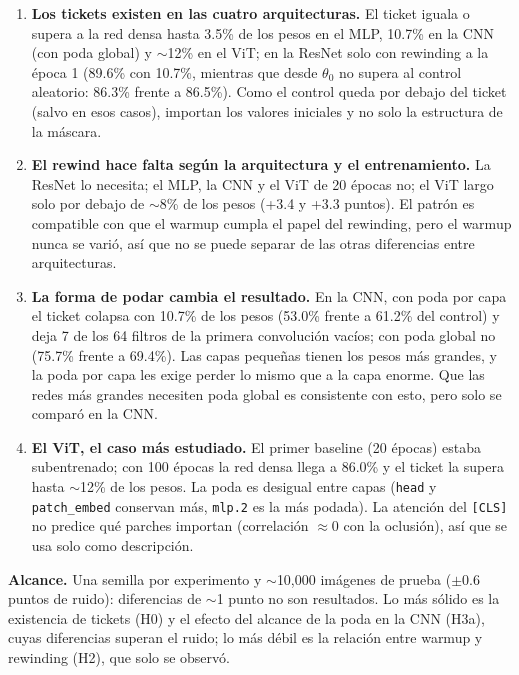 \documentclass[11pt]{article}
\begin{document}
\begin{enumerate}[nosep]
    \item \textbf{Los tickets existen en las cuatro arquitecturas.} El ticket iguala o supera a la red densa hasta 3.5\% de los pesos en el MLP, 10.7\% en la CNN (con poda global) y $\sim$12\% en el ViT; en la ResNet solo con rewinding a la época 1 (89.6\% con 10.7\%, mientras que desde $\theta_0$ no supera al control aleatorio: 86.3\% frente a 86.5\%). Como el control queda por debajo del ticket (salvo en esos casos), importan los valores iniciales y no solo la estructura de la máscara.
    \item \textbf{El rewind hace falta según la arquitectura y el entrenamiento.} La ResNet lo necesita; el MLP, la CNN y el ViT de 20 épocas no; el ViT largo solo por debajo de $\sim$8\% de los pesos (+3.4 y +3.3 puntos). El patrón es compatible con que el warmup cumpla el papel del rewinding, pero el warmup nunca se varió, así que no se puede separar de las otras diferencias entre arquitecturas.
    \item \textbf{La forma de podar cambia el resultado.} En la CNN, con poda por capa el ticket colapsa con 10.7\% de los pesos (53.0\% frente a 61.2\% del control) y deja 7 de los 64 filtros de la primera convolución vacíos; con poda global no (75.7\% frente a 69.4\%). Las capas pequeñas tienen los pesos más grandes, y la poda por capa les exige perder lo mismo que a la capa enorme. Que las redes más grandes necesiten poda global es consistente con esto, pero solo se comparó en la CNN.
    \item \textbf{El ViT, el caso más estudiado.} El primer baseline (20 épocas) estaba subentrenado; con 100 épocas la red densa llega a 86.0\% y el ticket la supera hasta $\sim$12\% de los pesos. La poda es desigual entre capas (\texttt{head} y \texttt{patch\_embed} conservan más, \texttt{mlp.2} es la más podada). La atención del \texttt{[CLS]} no predice qué parches importan (correlación $\approx0$ con la oclusión), así que se usa solo como descripción.
\end{enumerate}

\textbf{Alcance.} Una semilla por experimento y $\sim$10,000 imágenes de prueba ($\pm0.6$ puntos de ruido): diferencias de $\sim$1 punto no son resultados. Lo más sólido es la existencia de tickets (H0) y el efecto del alcance de la poda en la CNN (H3a), cuyas diferencias superan el ruido; lo más débil es la relación entre warmup y rewinding (H2), que solo se observó.
\end{document}
